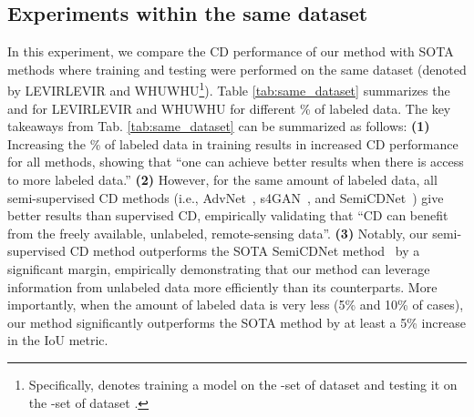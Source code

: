 \documentclass[runningheads]{llncs}
\begin{document}
\vspace{-4mm}
\subsection{Experiments within the same dataset}
\label{sec:same_dataset}
In this experiment, we compare the CD performance of our method with SOTA methods where training and testing were performed on the same dataset (denoted by LEVIRLEVIR and WHUWHU\footnote[1]{Specifically,  denotes training a model on the  -set of dataset  and testing it on the -set of dataset .}). Table \ref{tab:same_dataset} summarizes the  and  for LEVIRLEVIR and WHUWHU for different \% of labeled data. The key takeaways from Tab. \ref{tab:same_dataset} can be summarized as follows: \textbf{(1)} Increasing the \% of labeled data in training results in increased CD performance for all methods, showing that ``one can achieve better results when there is access to more labeled data.'' \textbf{(2)} However, for the same amount of labeled data, all semi-supervised CD methods (i.e., AdvNet~\cite{advnet}, s4GAN~\cite{s4GAN}, and SemiCDNet~\cite{SemiCDNet}) give better results than supervised CD, empirically validating that ``CD can benefit from the freely available, unlabeled, remote-sensing data''. \textbf{(3)} Notably, our semi-supervised CD method outperforms the SOTA SemiCDNet method~\cite{SemiCDNet} by a significant margin, empirically demonstrating that our method can leverage information from unlabeled data more efficiently than its counterparts. More importantly, when the amount of labeled data is very less (5\% and 10\% of cases), our method significantly outperforms the SOTA method by at least a 5\% increase in the IoU metric.
\end{document}
